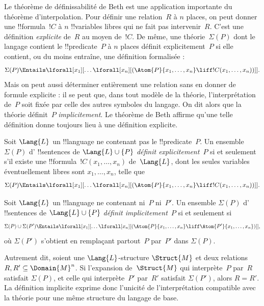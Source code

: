 \documentclass[../../../include/open-logic-section]{subfiles}
\begin{document}


Le théorème de définissabilité de Beth
est une application importante du
théorème d'interpolation. Pour définir
une relation~$R$ à $n$ places,
on peut donner une !!{formula}~$!C$
à $n$ !!{variable}s libres qui ne
fait pas intervenir~$R$. C'est une
définition \emph{explicite} de~$R$
au moyen de~$!C$. De même, une
théorie~$\Sigma(P)$ dont le langage
contient le !!{predicate}~$P$ à
$n$ places définit explicitement~$P$
si elle contient, ou du moins entraîne,
une définition formalisée :
\[
\Sigma(P)\Entails\lforall[x_1][\dots
  \lforall[x_n][(\Atom{P}{x_1,\dots,x_n}
  \liff !C(x_1,\dots,x_n))]].
\]
Mais on peut aussi déterminer
entièrement une relation sans en
donner de formule explicite : il
se peut que, dans tout modèle de
la théorie, l'interprétation de~$P$
soit fixée par celle des autres
symboles du langage. On dit alors
que la théorie définit~$P$
\emph{implicitement}. Le théorème
de Beth affirme qu'une telle
définition donne toujours lieu
à une définition explicite.

\begin{defn}
Soit $\Lang{L}$ un !!{language}
ne contenant pas le !!{predicate}~$P$.
Un ensemble $\Sigma(P)$ d'%
!!{sentence}s de $\Lang{L}\cup\{P\}$
\emph{définit explicitement}~$P$
si et seulement s'il existe une
!!{formula}~$!C(x_1,\dots,x_n)$
de~$\Lang{L}$, dont les seules variables éventuellement libres sont $x_1,\dots,x_n$, telle que
\[
\Sigma(P)\Entails\lforall[x_1][\dots
  \lforall[x_n][(\Atom{P}{x_1,\dots,x_n}
  \liff !C(x_1,\dots,x_n))]].
\]
\end{defn}

\begin{defn}
Soit $\Lang{L}$ un !!{language}
ne contenant ni~$P$ ni~$P'$.
Un ensemble $\Sigma(P)$ d'%
!!{sentence}s de $\Lang{L}\cup\{P\}$
\emph{définit implicitement}~$P$
si et seulement si
\[
\Sigma(P)\cup\Sigma(P')\Entails
  \lforall[x_1][\dots
  \lforall[x_n][(\Atom{P}{x_1,\dots,x_n}
  \liff\Atom{P'}{x_1,\dots,x_n})]],
\]
où $\Sigma(P')$ s'obtient en
remplaçant partout~$P$ par~$P'$
dans $\Sigma(P)$.
\end{defn}

Autrement dit, soient une
$\Lang{L}$-structure $\Struct{M}$
et deux relations
$R,R'\subseteq\Domain{M}^n$.
Si l'expansion de~$\Struct{M}$
qui interprète~$P$ par~$R$
satisfait $\Sigma(P)$, et celle
qui interprète~$P'$ par~$R'$
satisfait $\Sigma(P')$, alors
$R=R'$. La définition implicite
exprime donc l'unicité de
l'interprétation compatible avec
la théorie pour une même structure
du langage de base.
\end{document}

